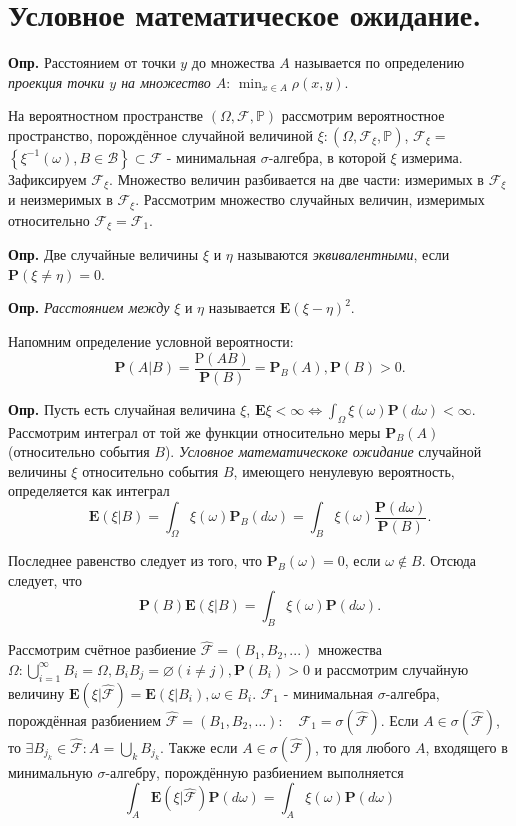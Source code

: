 \documentclass[oneside,final,14pt]{extreport}
\newcommand\mydef{{\bf Опр.}}
\newcommand\myprob[1]{{\mathbf{P}(#1)}}
\theoremstyle{definition}
\begin{document}
\section{Условное математическое ожидание.}

\mydef{} Расстоянием от точки $y$ до множества $A$ называется по определению {\it проекция точки $y$ на множество $A$}: $\min _{x \in A} \rho(x, y)$.

На вероятностном пространстве $(\Omega, \mathcal{F}, \mathbb{P})$ рассмотрим вероятностное пространство, порождённое случайной величиной $\xi: (\Omega, \mathcal{F}_\xi, \mathbb{P})$, $\mathcal{F}_\xi = $ $\left\{\xi^{-1}(\omega), B \in \mathcal{B}\right\} \subset \mathcal{F}$ - минимальная $\sigma$-алгебра, в которой $\xi$ измерима. Зафиксируем $\mathcal{F}_\xi.$ Множество величин разбивается на две части: измеримых в $\mathcal{F}_\xi$ и неизмеримых в $\mathcal{F}_\xi$. Рассмотрим множество случайных величин, измеримых относительно $\mathcal{F}_\xi = \mathcal{F}_1$.

\mydef{} Две случайные величины $\xi$ и $\eta$ называются {\it эквивалентными}, если $\myprob{\xi \neq \eta} = 0.$

\mydef{} {\it Расстоянием между} $\xi$ и $\eta$ называется $\mathbf{E}(\xi-\eta)^{2}$.

Напомним определение условной вероятности: $$\mathbf{P}(A | B)=\frac{\mathrm{P}(A B)}{\mathbf{P}(B)}=\mathbf{P}_{B}(A), \mathbf{P}(B)>0.$$

\mydef{} Пусть есть случайная величина $\xi$, $\mathbf{E} \xi<\infty \Leftrightarrow \int_{\Omega} \xi(\omega) \mathbf{P}(d \omega)<\infty.$ Рассмотрим интеграл от той же функции относительно меры $\mathbf{P}_{B}(A)$ (относительно события $B$). {\it Условное математическоке ожидание} случайной величины $\xi$ относительно события $B$, имеющего ненулевую вероятность, определяется как интеграл
$$\mathbf{E}(\xi | B)=\int_{\Omega} \xi(\omega) \mathbf{P}_{B}(d \omega)=\int_{B} \xi(\omega) \frac{\mathbf{P}(d \omega)}{\mathbf{P}(B)}.$$

Последнее равенство следует из того, что $\mathbf{P}_{B}(\omega) = 0$, если $\omega \notin B.$ Отсюда следует, что $$\mathbf{P}(B) \mathbf{E}(\xi | B)=\int_{B} \xi(\omega) \mathbf{P}(d \omega).$$

Рассмотрим счётное разбиение $\hat{\mathcal{F}} = (B_1, B_2, ...)$ множества $\Omega: \bigcup_{i=1}^{\infty} B_{i}=\Omega, B_{i} B_{j}=\varnothing(i \neq j), \myprob{B_i} > 0$ и рассмотрим случайную величину $\mathbf{E}(\xi | \hat{\mathcal{F}}) = \mathbf{E}\left(\xi | B_{i}\right), \omega \in B_{i}$. $\mathcal{F}_1$ - минимальная $\sigma$-алгебра, порождённая разбиением $\hat{\mathcal{F}}=\left(B_{1}, B_{2}, \ldots\right): \quad \mathcal{F}_{1}=\sigma(\hat{\mathcal{F}}).$ Если $A \in \sigma(\hat{\mathcal{F}})$, то $\exists B_{j_{k}} \in \hat{\mathcal{F}}: A=\bigcup_{k} B_{j_{k}}$. Также если $A \in \sigma(\hat{\mathcal{F}})$, то для любого $A$, входящего в минимальную $\sigma$-алгебру, порождённую разбиением выполняется
$$\int_{A} \mathbf{E}(\xi | \hat{\mathcal{F}}) \mathbf{P}(d \omega)=\int_{A} \xi(\omega) \mathbf{P}(d \omega)$$
\end{document}

